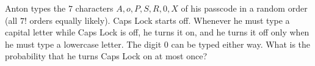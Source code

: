 Anton types the $7$ characters $A,o,P,S,R,0,X$ of his passcode in a random order (all $7!$ orders equally likely). Caps Lock starts off. Whenever he must type a capital letter while Caps Lock is off, he turns it on, and he turns it off only when he must type a lowercase letter. The digit $0$ can be typed either way. What is the probability that he turns Caps Lock on at most once?
